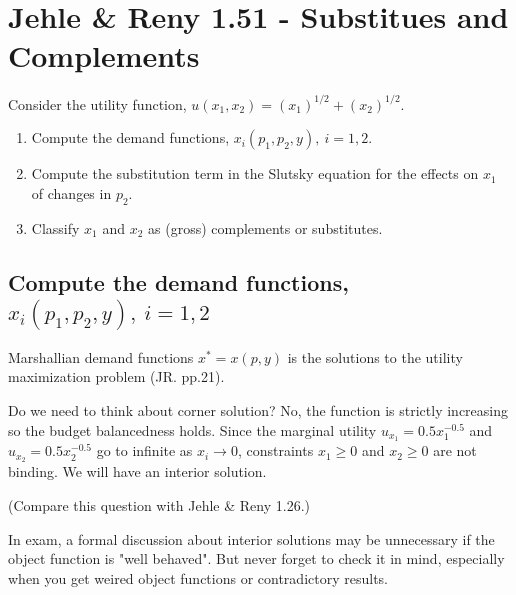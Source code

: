 \documentclass{article}
\begin{document}
\section{Jehle \& Reny 1.51 - Substitues and Complements}
Consider the utility function, $u(x_1, x_2) = (x_1)^{1/2} + (x_2)^{1/2}$.

\begin{enumerate}[label=\alph*.]

\item Compute the demand functions, $x_i(p_1, p_2, y), \ i = 1, 2$.

\item Compute the substitution term in the Slutsky equation for the effects on $x_1$ of changes in $p_2$.

\item Classify $x_1$ and $x_2$ as (gross) complements or substitutes.

\end{enumerate}

\subsection{Compute the demand functions, $x_i(p_1, p_2, y), \ i = 1, 2$}

\begin{mdframed}[backgroundcolor=blue!20,linecolor=white]
Marshallian demand functions $x^* = x(p, y)$ is the solutions 
to the utility maximization problem (JR. pp.21).

Do we need to think about corner solution? No, the function is strictly increasing so the budget balancedness holds. Since the marginal utility $u_{x_1} = 0.5x_1^{-0.5}$ and $u_{x_2} = 0.5x_2^{-0.5}$ go to infinite as $x_i \to 0$, constraints $x_1 \ge 0$  and  $x_2 \ge 0$ are not binding. We will have an interior solution.

(Compare this question with Jehle \& Reny 1.26.)
\end{mdframed}

\begin{mdframed}[backgroundcolor=yellow!20,linecolor=white]
In exam, a formal discussion about interior solutions may be unnecessary if the object function is "well behaved". But never forget to check it in mind, especially when you get weired object functions or contradictory results.
\end{mdframed}
\end{document}
